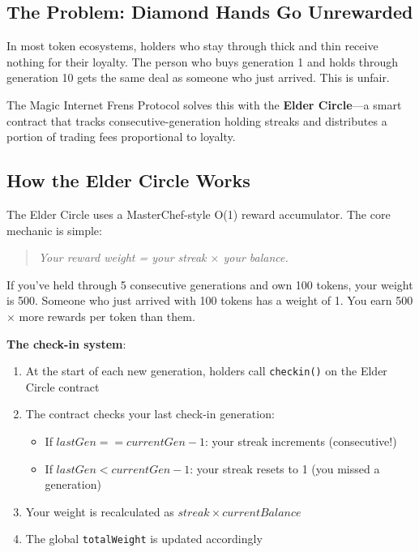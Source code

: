\documentclass[11pt,a4paper]{article}
\begin{document}
\subsection{The Problem: Diamond Hands Go Unrewarded}

In most token ecosystems, holders who stay through thick and thin receive nothing for their loyalty. The person who buys generation 1 and holds through generation 10 gets the same deal as someone who just arrived. This is unfair.

The Magic Internet Frens Protocol solves this with the \textbf{Elder Circle}---a smart contract that tracks consecutive-generation holding streaks and distributes a portion of trading fees proportional to loyalty.

\subsection{How the Elder Circle Works}

The Elder Circle uses a MasterChef-style O(1) reward accumulator. The core mechanic is simple:

\begin{quote}
\textit{Your reward weight = your streak $\times$ your balance.}
\end{quote}

If you've held through 5 consecutive generations and own 100 tokens, your weight is 500. Someone who just arrived with 100 tokens has a weight of 1. You earn 500$\times$ more rewards per token than them.

\textbf{The check-in system}:

\begin{enumerate}
    \item At the start of each new generation, holders call \texttt{checkin()} on the Elder Circle contract
    \item The contract checks your last check-in generation:
    \begin{itemize}
        \item If $lastGen == currentGen - 1$: your streak increments (consecutive!)
        \item If $lastGen < currentGen - 1$: your streak resets to 1 (you missed a generation)
    \end{itemize}
    \item Your weight is recalculated as $streak \times currentBalance$
    \item The global \texttt{totalWeight} is updated accordingly
\end{enumerate}
\end{document}
